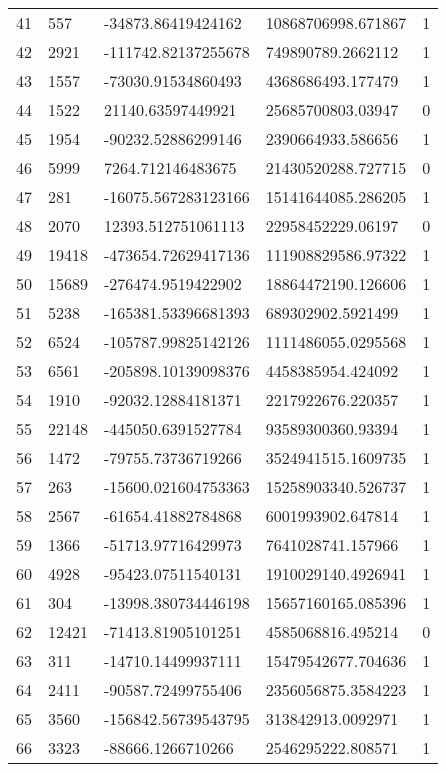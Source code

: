 \begin{longtable}{lllll}
    41 & 557 & -34873.86419424162 & 10868706998.671867 & 1 \\
    42 & 2921 & -111742.82137255678 & 749890789.2662112 & 1 \\
    43 & 1557 & -73030.91534860493 & 4368686493.177479 & 1 \\
    44 & 1522 & 21140.63597449921 & 25685700803.03947 & 0 \\
    45 & 1954 & -90232.52886299146 & 2390664933.586656 & 1 \\
    46 & 5999 & 7264.712146483675 & 21430520288.727715 & 0 \\
    47 & 281 & -16075.567283123166 & 15141644085.286205 & 1 \\
    48 & 2070 & 12393.512751061113 & 22958452229.06197 & 0 \\
    49 & 19418 & -473654.72629417136 & 111908829586.97322 & 1 \\
    50 & 15689 & -276474.9519422902 & 18864472190.126606 & 1 \\
    51 & 5238 & -165381.53396681393 & 689302902.5921499 & 1 \\
    52 & 6524 & -105787.99825142126 & 1111486055.0295568 & 1 \\
    53 & 6561 & -205898.10139098376 & 4458385954.424092 & 1 \\
    54 & 1910 & -92032.12884181371 & 2217922676.220357 & 1 \\
    55 & 22148 & -445050.6391527784 & 93589300360.93394 & 1 \\
    56 & 1472 & -79755.73736719266 & 3524941515.1609735 & 1 \\
    57 & 263 & -15600.021604753363 & 15258903340.526737 & 1 \\
    58 & 2567 & -61654.41882784868 & 6001993902.647814 & 1 \\
    59 & 1366 & -51713.97716429973 & 7641028741.157966 & 1 \\
    60 & 4928 & -95423.07511540131 & 1910029140.4926941 & 1 \\
    61 & 304 & -13998.380734446198 & 15657160165.085396 & 1 \\
    62 & 12421 & -71413.81905101251 & 4585068816.495214 & 0 \\
    63 & 311 & -14710.14499937111 & 15479542677.704636 & 1 \\
    64 & 2411 & -90587.72499755406 & 2356056875.3584223 & 1 \\
    65 & 3560 & -156842.56739543795 & 313842913.0092971 & 1 \\
    66 & 3323 & -88666.1266710266 & 2546295222.808571 & 1 \\

\end{longtable}
